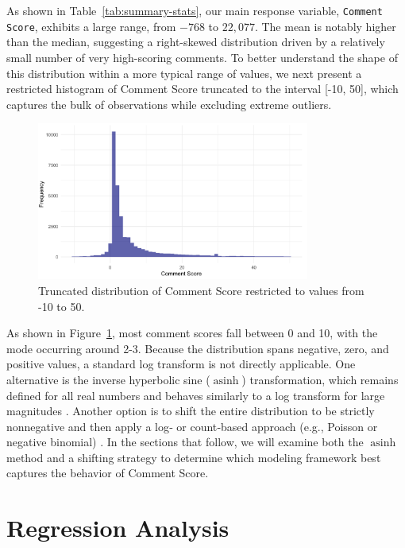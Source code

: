 \documentclass[10pt]{article}
\begin{document}
\noindent As shown in Table~\ref{tab:summary-stats}, our main response variable, \texttt{Comment Score}, exhibits a large range, from \(-768\) to \(22{,}077\). The mean is notably higher than the median, suggesting a right-skewed distribution driven by a relatively small number of very high-scoring comments. To better understand the shape of this distribution within a more typical range of values, we next present a restricted histogram of Comment Score truncated to the interval [-10, 50], which captures the bulk of observations while excluding extreme outliers.

\begin{figure}[H]
    \centering
    \includegraphics[width=0.8\textwidth]{pictures/score_distribution_zoomed.png}
    \caption{Truncated distribution of Comment Score restricted to values from -10 to 50.}
    \label{fig:comment-score-zoomed}
\end{figure}

\noindent As shown in Figure~\ref{fig:comment-score-zoomed}, most comment scores fall between 0 and 10, with the mode occurring around 2-3. Because the distribution spans negative, zero, and positive values, a standard log transform is not directly applicable. One alternative is the inverse hyperbolic sine (\(\operatorname{asinh}\)) transformation, which remains defined for all real numbers and behaves similarly to a log transform for large magnitudes \citep{burbidge1988, mackinnon1990}. Another option is to shift the entire distribution to be strictly nonnegative and then apply a log‐ or count‐based approach (e.g., Poisson or negative binomial) \cite{cameron1998}. In the sections that follow, we will examine both the \(\operatorname{asinh}\) method and a shifting strategy to determine which modeling framework best captures the behavior of Comment Score.


\section{Regression Analysis}
\end{document}
